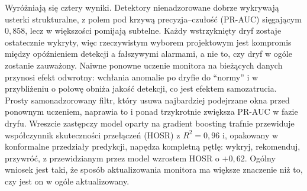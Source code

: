 {Wyróżniają się cztery wyniki. Detektory nienadzorowane dobrze wykrywają usterki
strukturalne, z polem pod krzywą precyzja--czułość (PR-AUC) sięgającym $0,858$,
lecz w większości pomijają subtelne. Każdy
wstrzyknięty dryf zostaje ostatecznie wykryty, więc rzeczywistym wyborem
projektowym jest kompromis między opóźnieniem detekcji a fałszywymi alarmami, a
nie to, czy dryf w ogóle zostanie zauważony. Naiwne ponowne uczenie monitora na
bieżących danych przynosi efekt odwrotny: wchłania anomalie po dryfie do
``normy'' i w przybliżeniu o połowę obniża jakość detekcji, co jest efektem
samozatrucia. Prosty samonadzorowany filtr, który usuwa najbardziej podejrzane
okna przed ponownym uczeniem, naprawia to i ponad trzykrotnie zwiększa PR-AUC w
fazie dryfu. Wreszcie zastępczy model oparty na gradient boosting trafnie
przewiduje współczynnik skuteczności przełączeń (HOSR) z $R^2 = 0,96$ i,
opakowany w konformalne przedziały predykcji,
napędza kompletną pętlę: wykryj, rekomenduj, przywróć, z przewidzianym przez
model wzrostem HOSR o $+0,62$. Ogólny wniosek jest taki, że sposób aktualizowania
monitora ma większe znaczenie niż to, czy jest on w ogóle aktualizowany.

}
